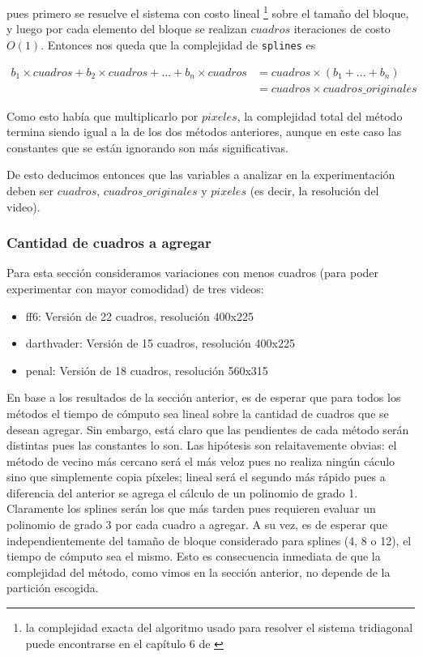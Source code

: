pues primero se resuelve el sistema con costo lineal \footnote{la complejidad exacta del algoritmo usado para resolver el sistema tridiagonal puede encontrarse en el capítulo 6 de \cite{burden}} sobre el tamaño del bloque, y luego por cada elemento del bloque se realizan $cuadros$ iteraciones de costo $O(1)$. Entonces nos queda que la complejidad de \texttt{splines} es

\begin{equation*}
\begin{split}
b_1 \times cuadros + b_2 \times cuadros + ... + b_n \times cuadros & = cuadros \times (b_1 + ... + b_n) \\
& = cuadros \times cuadros\_originales
\end{split}
\end{equation*}

Como esto había que multiplicarlo por $pixeles$, la complejidad total del método termina siendo igual a la de los dos métodos anteriores, aunque en este caso las constantes que se están ignorando son más significativas.

De esto deducimos entonces que las variables a analizar en la experimentación deben ser $cuadros$,  $cuadros\_originales$ y $pixeles$ (es decir, la resolución del video).

\subsubsection{Cantidad de cuadros a agregar}
Para esta sección consideramos variaciones con menos cuadros (para poder experimentar con mayor comodidad) de tres videos:
\begin{itemize}
	\item ff6: Versión de 22 cuadros, resolución 400x225
	\item darthvader: Versión de 15 cuadros, resolución 400x225
	\item penal: Versión de 18 cuadros, resolución 560x315
\end{itemize}

En base a los resultados de la sección anterior, es de esperar que para todos los métodos el tiempo de cómputo sea lineal sobre la cantidad de cuadros que se desean agregar. Sin embargo, está claro que las pendientes de cada método serán distintas pues las constantes lo son.  
Las hipótesis son relaitavemente obvias: el método de vecino más cercano será el más veloz pues no realiza ningún cáculo sino que simplemente copia píxeles; lineal será el segundo más rápido pues a diferencia del anterior se agrega el cálculo de un polinomio de grado 1. Claramente los splines serán los que más tarden pues requieren evaluar un polinomio de grado 3 por cada cuadro a agregar. A su vez, es de esperar que independientemente del tamaño de bloque considerado para splines (4, 8 o 12), el tiempo de cómputo sea el mismo. Esto es consecuencia inmediata de que la complejidad del método, como vimos en la sección anterior, no depende de la partición escogida.


